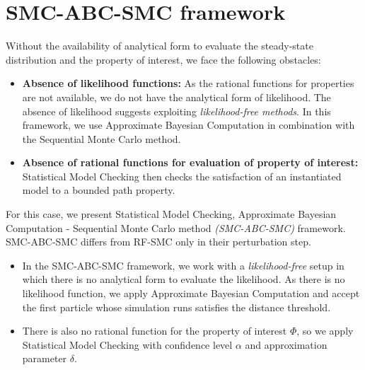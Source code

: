 \section{SMC-ABC-SMC framework}
Without the availability of analytical form to evaluate the steady-state distribution and the property of
interest, we face the following obstacles:
\begin{itemize}
    \item \textbf{Absence of likelihood functions:} As the rational functions for properties are not
          available, we do not have the analytical form of likelihood. The absence of likelihood
          suggests exploiting \textit{likelihood-free methods}. In this framework, we use Approximate
          Bayesian Computation in combination with the Sequential Monte Carlo method.
    \item \textbf{Absence of rational functions for evaluation of property of interest:} Statistical
          Model Checking then checks the satisfaction of an instantiated model to a bounded path property.
\end{itemize}
For this case, we present Statistical Model Checking, Approximate Bayesian Computation - Sequential
Monte Carlo method \textit{(SMC-ABC-SMC)} framework. SMC-ABC-SMC differs from RF-SMC only in their
perturbation step.
\begin{itemize}
    \item In the SMC-ABC-SMC framework, we work with a \textit{likelihood-free} setup in which there is
          no analytical form to evaluate the likelihood. As there is no likelihood function, we
          apply Approximate Bayesian Computation and  accept the first particle whose simulation runs
          satisfies the distance threshold.
    \item There is also no rational function for the property of interest $\Phi$, so we apply
          Statistical Model Checking with confidence level $\alpha$ and approximation parameter $\delta$.
\end{itemize}

